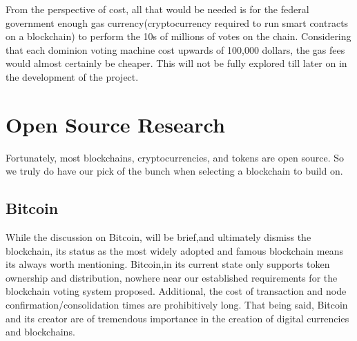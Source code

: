 \documentclass{article}
\begin{document}
\smallbreak \noindent 
From the perspective of cost, all that would be needed is for the federal government enough gas currency(cryptocurrency required to run smart contracts on a blockchain) to perform the 10s of millions of votes on the chain. Considering that each dominion voting machine cost upwards of 100,000 dollars, the gas fees would almost certainly be cheaper. This will not be fully explored till later on in the development of the project.

\section{Open Source Research}
Fortunately, most blockchains, cryptocurrencies, and tokens are open source. So we truly do have our pick of the bunch when selecting a blockchain to build on.

\subsection{Bitcoin}
While the discussion on Bitcoin, will be brief,and ultimately dismiss the blockchain, its status as the most widely adopted and famous blockchain means its always worth mentioning. Bitcoin,in its current state only supports token ownership and distribution, nowhere near our established requirements for the blockchain voting system proposed. Additional, the cost of transaction and node confirmation/consolidation times are prohibitively long. That being said, Bitcoin and its creator are of tremendous importance in the creation of digital currencies and blockchains.\cite{budish2018economic}
\end{document}
